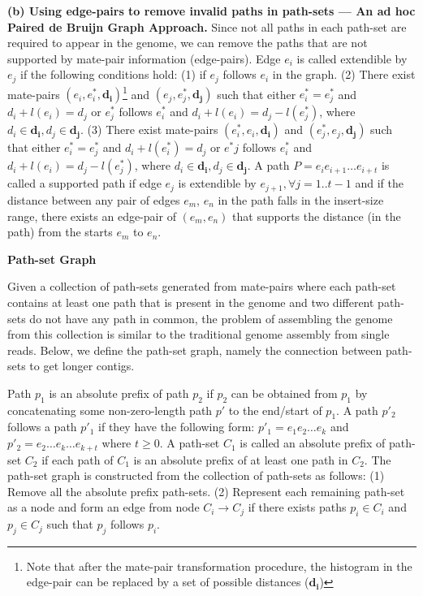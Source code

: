 \documentclass[12pt,a4paper,oneside]{article}
\begin{document}
\textbf{(b) Using edge-pairs to remove invalid paths in path-sets  --- An ad hoc Paired de Bruijn Graph Approach.}
Since not all paths in each path-set are required to appear in the genome, we  can remove the paths that are not supported by mate-pair information (edge-pairs). Edge $e_i$ is called 
extendible by $e_j$  if the following conditions hold: (1) if $e_j$ follows $e_i$ in the graph.
(2) There exist mate-pairs $(e_i, e^*_i, \mathbf{d_i})$\footnote{Note that after the mate-pair transformation procedure, the 
histogram in the edge-pair can be replaced by a set of possible distances ($\mathbf{d_i}$)}  and $(e_j, e^*_j,\mathbf{d_j})$ such that 
either $e^*_i = e^*_j$ and $d_i + l(e_i) = d_j$ 
or $e^*_j$ follows $e^*_i$ and $d_i + l(e_i) = d_j - l(e^*_j)$, where $d_i \in \mathbf{d_i}, d_j \in \mathbf{d_j}$. (3) There exist mate-pairs $(e^*_i, e_i, \mathbf{d_i})$
 and $(e^*_j, e_j,\mathbf{d_j})$ such that 
either $e^*_i = e^*_j$ and $d_i + l(e^*_i) = d_j$ 
or $e^*j$ follows $e^*_i$ and $d_i + l(e_i) = d_j - l(e^*_j)$, where $d_i \in \mathbf{d_i}, d_j \in \mathbf{d_j}$. A path $P= e_i e_{i+1} \ldots e_{i+t}$ is called a supported 
path if edge $e_{j}$  is extendible by $e_{j+1}, \forall j = 1..t-1$ and if the distance between any pair of edges $e_m$, $e_n$  in the path falls in 
the insert-size range, there exists an edge-pair of $(e_m,e_n)$ that supports the distance (in the path) from the starts $e_m$ to $e_n$.


\textbf{Path-set Graph}

Given a collection of path-sets generated from mate-pairs  where 
each path-set contains at least one path that is present in the genome and two different path-sets
do not have any path in common, the problem of assembling the genome from this collection is similar to 
the traditional genome assembly from single reads. Below, we define the path-set graph, namely the 
connection between path-sets to get longer contigs. 





Path $p_1$ is an absolute prefix of path $p_2$ if $p_2$ can be obtained from $p_1$ by
concatenating some non-zero-length path $p'$
to the end/start of $p_1$. A path $p'_2$ follows a path $p'_1$ if they have the following form:
$p'_1 = e_1e_2\ldots e_k$ and $p'_2= e_2\ldots e_k \ldots e_{k+t}$ where $t \geq 0$. 
A path-set $C_1$ is called an absolute prefix of path-set $C_2$ if each path of $C_1$ is an absolute 
prefix of at least one path in $C_2$. The path-set graph is constructed from the collection of path-sets as follows: (1) Remove all
the absolute prefix path-sets. (2) Represent each remaining path-set as a node and form an edge from node $C_i \rightarrow C_j$ if
there exists paths $p_i \in C_i$ and $p_j \in C_j$ such that $p_j$ follows $p_i$.
\end{document}
